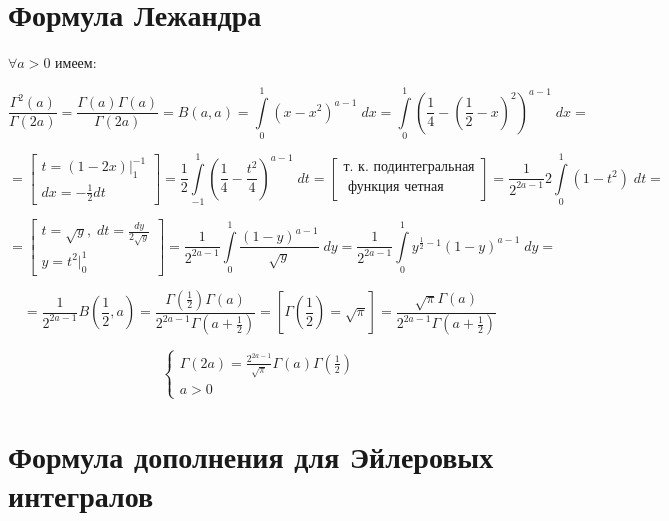 \documentclass[../../main.tex]{subfiles}
\begin{document}
	\section{Формула Лежандра}
	
	$\forall a > 0$ имеем:
	
	\[ \frac{\Gamma^2(a)}{\Gamma(2a)} = \frac{\Gamma(a) \Gamma(a)}{\Gamma(2a)} = 
	B(a,a) = \int\limits_{0}^{1} \left(x-x^2 \right) ^{a-1} \; dx = 
	\int\limits_{0}^{1} \left(\frac{1}{4} - \left( \frac{1}{2} - x\right)^2  
	\right) ^{a-1} \; dx =  \]
	
	\[  =  \left[  \begin{gathered}
	t = (1-2x) \bigg|_{1}^{-1} \\
	dx = -\frac{1}{2} dt 
	\end{gathered}   \right] = \frac{1}{2}  \int\limits_{-1}^{1} \left( 
	\frac{1}{4} - \frac{t^2}{4}  \right)^{a-1} \; dt =\left[ 
	\begin{gathered}
	\text{т.~к. подинтегральная} \\
	\text{ функция четная}
	\end{gathered}	\right] = \frac{1}{2^{2a-1}}  2 \int\limits_{0}^{1} \left( 
	1-t^2  \right)  \; dt =     \] 
	
	\[  =  \left[  \begin{gathered}
	t = \sqrt{y}, \; dt = \frac{dy}{2\sqrt{y}} \\
	y = t^2  \bigg|_{0}^{1}
	\end{gathered}   \right] =  \frac{1}{2^{2a-1}} \int\limits_{0}^{1} 
	\frac{(1-y)^{a-1}}{\sqrt{y}} \; dy  = \frac{1}{2^{2a-1}} \int\limits_{0}^{1} 
	y^{\frac{1}{2} - 1}(1-y)^{a-1} \; dy  =     \]
	
	\[  = \frac{1}{2^{2a-1}} B\left( \frac{1}{2},a \right) = \frac{\Gamma\left( 
	\frac{1}{2} \right) \Gamma(a) }{2^{2a-1} \Gamma\left( a + \frac{1}{2} 
	\right)} = \left[ \Gamma\left( \frac{1}{2} \right) = \sqrt{\pi}  \right] = 
	\frac{\sqrt{\pi} \Gamma(a) }{2^{2a-1} \Gamma\left( a + \frac{1}{2} \right)}   
	 \]
	
	\begin{equation}
	\label{14:13}
	\begin{cases}
		\Gamma(2a) = \frac{2^{2a-1}}{\sqrt{\pi}} \Gamma(a) \Gamma\left( \frac{1}{2} 
		\right) \\
		a > 0
	\end{cases}
	\end{equation}
	
	\section{Формула дополнения для Эйлеровых интегралов}
	
\end{document}
